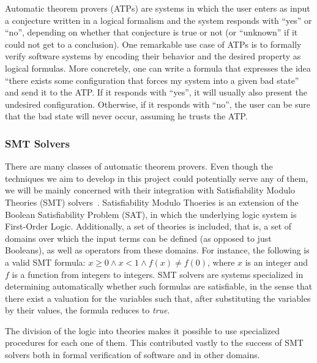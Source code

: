\documentclass[a4paper, 12pt]{article}
\begin{document}
Automatic theorem provers (ATPs) are systems in which the user enters as input a conjecture written in
a logical
formalism and the system responds with ``yes'' or ``no'', depending on whether that conjecture is true or
not (or ``unknown'' if it could not get to a conclusion).
One remarkable use case of ATPs is to formally verify software systems by encoding
their behavior and the desired property as logical formulas. More concretely,
one can write a formula that expresses the idea ``there exists some configuration
that forces my system into a given bad state'' and send it to the ATP. If it responds
with ``yes'', it will usually also present the undesired configuration. Otherwise,
if it responds with ``no'', the user can be sure that the bad state will never occur,
assuming he trusts the ATP.

\subsubsection{SMT Solvers}

There are many classes of automatic theorem provers. Even though the techniques we aim
to develop in this project could potentially serve any of them, we will be mainly concerned with
their integration with Satisfiability Modulo Theories (SMT) solvers~\cite{smtbook}.
Satisfiability Modulo Thoeries is an extension of the Boolean Satisfiability Problem (SAT),
in which the underlying logic system is First-Order Logic. Additionally, a set of theories
is included, that is, a set of domains over which the input terms can be defined (as opposed
to just Booleans), as well as operators from these domains. For instance, the following is
a valid SMT formula: $x \ge 0 \wedge x < 1 \wedge f(x) \neq f(0)$, where $x$ is an integer
and $f$ is a function from integers to integers.
%
SMT solvers are systems specialized in determining automatically whether such formulas are satisfiable,
in the sense that there exist a valuation for the variables such that, after substituting the variables by
their values, the formula reduces to \textit{true}.

The division of the logic into theories makes it possible to use specialized procedures for each
one of them. This contributed vastly to the success of SMT solvers both in formal verification of software and in other domains.
\end{document}
